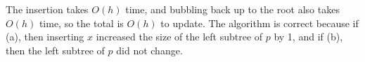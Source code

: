 \documentclass{article}
\begin{document}
\begin{enumerate}[(a)]
\begin{soln}
			The insertion takes $O(h)$ time, and bubbling back up to the root also takes $O(h)$ time, so the total is $O(h)$ to update. The algorithm is correct because if (a), then inserting $x$ increased the size of the left subtree of $p$ by 1, and if (b), then the left subtree of $p$ did not change.
		\end{soln}
		
\end{enumerate}
\end{document}
